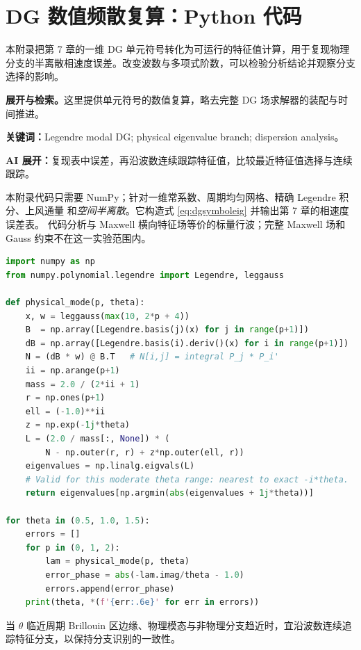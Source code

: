 \documentclass[UTF8,11pt,openany]{ctexbook}
\numberwithin{equation}{chapter}
\theoremstyle{definition}
\theoremstyle{remark}
\newcommand{\studyroute}[3]{%
  \par\smallskip\noindent\textbf{展开与检索。}#1\par
  \noindent\textbf{关键词：}#2。\par
  \noindent\textbf{AI 展开：}#3\par
}
\begin{document}
\chapter{DG 数值频散复算：Python 代码}
\begin{chaptersummary}
本附录把第 7 章的一维 DG 单元符号转化为可运行的特征值计算，用于复现物理分支的半离散相速度误差。改变波数与多项式阶数，可以检验分析结论并观察分支选择的影响。
\end{chaptersummary}
\studyroute{这里提供单元符号的数值复算，略去完整 DG 场求解器的装配与时间推进。}{Legendre modal DG; physical eigenvalue branch; dispersion analysis}{复现表中误差，再沿波数连续跟踪特征值，比较最近特征值选择与连续跟踪。}
本附录代码只需要 NumPy；针对一维常系数、周期均匀网格、精确 Legendre 积分、上风通量
和\emph{空间半离散}。它构造式 \eqref{eq:dgsymboleig} 并输出第 7 章的相速度误差表。
代码分析与 Maxwell 横向特征场等价的标量行波；完整 Maxwell 场和 Gauss 约束不在这一实验范围内。

\begin{lstlisting}[language=Python,caption={Legendre 模态 DG 的空间色散：物理特征值分析}]
import numpy as np
from numpy.polynomial.legendre import Legendre, leggauss

def physical_mode(p, theta):
    x, w = leggauss(max(10, 2*p + 4))
    B  = np.array([Legendre.basis(j)(x) for j in range(p+1)])
    dB = np.array([Legendre.basis(i).deriv()(x) for i in range(p+1)])
    N = (dB * w) @ B.T   # N[i,j] = integral P_j * P_i'
    ii = np.arange(p+1)
    mass = 2.0 / (2*ii + 1)
    r = np.ones(p+1)
    ell = (-1.0)**ii
    z = np.exp(-1j*theta)
    L = (2.0 / mass[:, None]) * (
        N - np.outer(r, r) + z*np.outer(ell, r))
    eigenvalues = np.linalg.eigvals(L)
    # Valid for this moderate theta range: nearest to exact -i*theta.
    return eigenvalues[np.argmin(abs(eigenvalues + 1j*theta))]

for theta in (0.5, 1.0, 1.5):
    errors = []
    for p in (0, 1, 2):
        lam = physical_mode(p, theta)
        error_phase = abs(-lam.imag/theta - 1.0)
        errors.append(error_phase)
    print(theta, *(f'{err:.6e}' for err in errors))
\end{lstlisting}
当 $\theta$ 临近周期 Brillouin 区边缘、物理模态与非物理分支趋近时，宜沿波数连续追踪特征分支，以保持分支识别的一致性。
\end{document}
